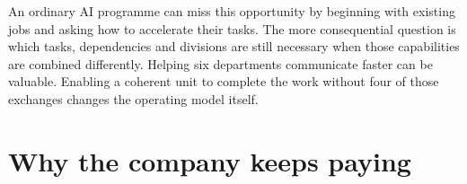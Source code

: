 \begin{EssayColumns}
An ordinary AI programme can miss this opportunity by beginning with
existing jobs and asking how to accelerate their tasks. The more
consequential question is which tasks, dependencies and divisions are
still necessary when those capabilities are combined differently.
Helping six departments communicate faster can be valuable. Enabling a
coherent unit to complete the work without four of those exchanges
changes the operating model itself.

\end{EssayColumns}


\clearpage

\section{Why the company keeps
paying}\label{why-the-company-keeps-paying}


